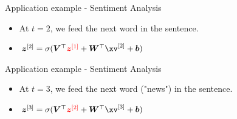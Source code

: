 \begin{frame} {Application example - Sentiment Analysis}
  \begin{itemize}
    \item At $t = 2$, we feed the next word in the sentence.
    \item $\bm{z}^{[2]} = \sigma(\bm{V}^\top\textcolor{red}{\bm{z}^{[1]}} + \bm{W}^\top \xv^{[2]} + \bm{b})$
  \end{itemize}
  \begin{figure}
      \centering
  \end{figure}
\end{frame}

\begin{frame} {Application example - Sentiment Analysis}
  \begin{itemize}
    \item At $t = 3$, we feed the next word ("news") in the sentence.
    \item $\bm{z}^{[3]} = \sigma(\bm{V}^\top\textcolor{red}{\bm{z}^{[2]}} + \bm{W}^\top \xv^{[3]} + \bm{b})$
  \end{itemize}
  \begin{figure}
      \centering
  \end{figure}
\end{frame}

